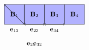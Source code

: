 \documentclass[10pt]{article}
\begin{document}
\[
\small\sf
\begin{tikzpicture}[node distance=2cm]
    \foreach \i in {1,...,4} {
        \draw[fill=blue!30] (\i,0) rectangle (\i+1,-1);
        \node at (\i+0.5,-0.5) {\(\textbf{B}_\i\)};
    }

    \draw[->] (1,0) -- (2,-1);
    \draw[->] (2,-1) -- (3,-1);
    \draw[->] (3,-1) -- (4,-1);
    \draw[->] (4,-1) -- (3,-1);
    \draw[->] (3,-1) -- (2,-1);
    \draw[->] (2,-1) -- (1,0);

    \node at (1.5,-1.5) [above] {\(\textbf{e}_{12}\)};
    \node at (2.5,-1.5) [above] {\(\textbf{e}_{23}\)};
    \node at (3.5,-1.5) [above] {\(\textbf{e}_{34}\)};
    \node at (3,-2) [left] {\(\textbf{e}_{32}\)};
    \node at (2,-2) [right] {\(\textbf{e}_{21}\)};
\end{tikzpicture}
\]
\end{document}
